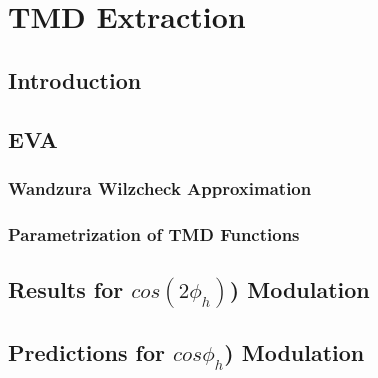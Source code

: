 \chapter{TMD Extraction}

\section{Introduction}

\section{EVA}
\subsection{Wandzura Wilzcheck Approximation}
\subsection{Parametrization of TMD Functions}
\section{Results for $cos(2\phi_h)$) Modulation}
\section{Predictions for $cos\phi_h$) Modulation}
